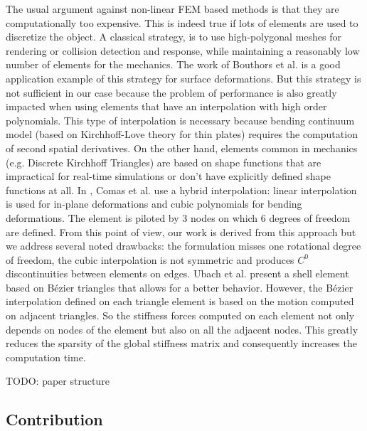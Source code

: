 \documentclass{egpubl}
\begin{document}
The usual argument against non-linear FEM based methods is that they are computationally too expensive. 
This is indeed true if lots of elements are used to discretize the object.
A classical strategy, is to use high-polygonal meshes for rendering or collision detection and response, while maintaining a reasonably low number of elements for the mechanics.
The work of Bouthors et al.\cite{Bouthors2007} is a good application example of this strategy for surface deformations.
But this strategy is not sufficient in our case because the problem of performance is also greatly impacted when using elements that have an interpolation with high order polynomials.
This type of interpolation is necessary because bending continuum model
(based on Kirchhoff-Love theory for thin plates)  requires the computation of second spatial derivatives.
On the other hand, elements common in mechanics (e.g. Discrete Kirchhoff Triangles) are based on shape functions that are impractical for real-time simulations or don't have explicitly defined shape functions at all.
In \cite{Comas2010c}, Comas et al. use a hybrid interpolation: linear interpolation is used for in-plane deformations and cubic polynomials for bending deformations.
The element is piloted by 3 nodes on which 6 degrees of freedom are defined. 
From this point of view, our work is derived from this approach but we address several noted drawbacks: the formulation misses one rotational degree of freedom, the cubic interpolation is not symmetric and produces $C^0$  discontinuities between elements on edges.
Ubach et al. \cite{Ubach2010}  present a shell element based on B\'ezier triangles that allows for a better behavior.
However, the B\'ezier interpolation defined on each triangle element is based on the motion computed on adjacent triangles.
So the stiffness forces computed on each element not only depends on nodes of the element but also on all the adjacent nodes. 
This greatly reduces the sparsity of the global stiffness matrix and consequently increases the computation time.


TODO: paper structure

\subsection{Contribution}
\end{document}
